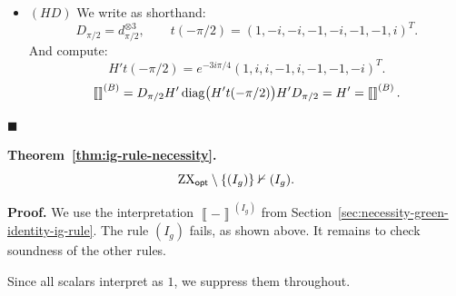 \documentclass[copyright,creativecommons]{eptcs}
\newcommand{\typedfig}[1]{\IfFileExists{latex_typed/b_rule_note/figures/#1.tikz}{}{}}
\newcommand{\tombstone}{\par\nobreak\hfill\ensuremath{\blacksquare}}
\newcommand{\zxfig}[1]{\vcenter{\hbox{\scalebox{1}{\typedfig{#1}}}}}
\newcommand{\zxsmall}[1]{\vcenter{\hbox{\scalebox{0.85}{\typedfig{#1}}}}}
\newcommand{\zxopt}{\ensuremath{\textup{ZX}_{\textsf{opt}}}\xspace}
\newcommand{\sem}[1]{\left\llbracket #1 \right\rrbracket}
\theoremstyle{definition}
\theoremstyle{remark}
\begin{document}
\begin{itemize}
We define \(d_\theta\) and \(D_\theta\) as shorthand, and recall the definitions of \(H_0\) and \(H'\):
\[
d_\theta:=\operatorname{diag}(1,e^{i\theta}),
\qquad
D_\theta:=(Z')^\theta_{1,1}=d_\theta^{\otimes 3},
\qquad
H_0=h^{\otimes 3},
\qquad
H'=O^{-1}H_0O.
\]
Since \(N\) only acts within the weight-one subspace, \(O\) commutes with every \(D_\theta\).
\[
\sem{\zxsmall{EU-LHS-only}}^{(B)}
=(Z')^{\alpha_3}_{1,1}\circ (X')^{\alpha_2}_{1,1}\circ (Z')^{\alpha_1}_{1,1}
=D_{\alpha_3}H'D_{\alpha_2}H'D_{\alpha_1}.
\]
\[
\sem{\zxsmall{EU-RHS-only}}^{(B)}
=e^{3i\gamma}\cdot (X')^{\beta_3}_{1,1}\circ (Z')^{\beta_2}_{1,1}\circ (X')^{\beta_1}_{1,1}
=e^{3i\gamma}\cdot H'D_{\beta_3}H'D_{\beta_2}H'D_{\beta_1}H'.
\]

The corresponding scalar-free qubit Euler identity is
\[
 d_{\alpha_3}h d_{\alpha_2}h d_{\alpha_1}
=e^{i\gamma}h d_{\beta_3}h d_{\beta_2}h d_{\beta_1}h.
\]
Tensoring this identity three times gives
\[
D_{\alpha_3}H_0D_{\alpha_2}H_0D_{\alpha_1}
=
e^{3i\gamma}H_0D_{\beta_3}H_0D_{\beta_2}H_0D_{\beta_1}H_0.
\]
Conjugating by \(O\) gives
\[
D_{\alpha_3}H'D_{\alpha_2}H'D_{\alpha_1}
=
e^{3i\gamma}H'D_{\beta_3}H'D_{\beta_2}H'D_{\beta_1}H',
\]
as desired!

\item \((HD)\)
We write as shorthand:
\[
D_{\pi/2}=d_{\pi/2}^{\otimes 3},
\qquad
t(-\pi/2)=(1,-i,-i,-1,-i,-1,-1,i)^T.
\]
And compute:
\[
H't(-\pi/2)
=
e^{-3i\pi/4}(1,i,i,-1,i,-1,-1,-i)^T.
\]
\[
\sem{\zxfig{HD-RHS-only}}^{(B)}
=D_{\pi/2}H'\operatorname{diag}\bigl(H't(-\pi/2)\bigr)H'D_{\pi/2}
=H'
=\sem{\zxfig{Hadamard}}^{(B)}.
\]
\end{itemize}
\tombstone

\label{app:ig-rule-soundness-checks}

\bigskip

\noindent\textbf{Theorem~\ref{thm:ig-rule-necessity}.}
\[
\zxopt\setminus\{(I_g)\}\nvdash (I_g).
\]

\noindent\textbf{Proof.}
We use the interpretation \(\sem{-}^{(I_g)}\) from Section~\ref{sec:necessity-green-identity-ig-rule}.
The rule \((I_g)\) fails, as shown above.
It remains to check soundness of the other rules.

Since all scalars interpret as \(1\), we suppress them throughout.
\end{document}
